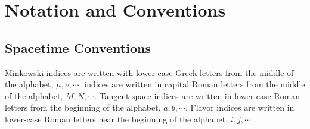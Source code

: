 \documentclass[12pt, oneside]{report}    %
\let\oldsection\section
\def\section{%
  \setcounter{sidenote}{1}%
  \oldsection
}
\begin{document}
\chapter{Notation and Conventions}

\section{Spacetime Conventions}
\label{app:spacetime:conventions}


 Minkowski indices are written with lower-case Greek letters from the middle of the alphabet, $\mu, \nu, \cdots$.  indices are written in capital Roman letters from the middle of the alphabet, $M, N, \cdots$. Tangent space indices are written in lower-case Roman letters from the beginning of the alphabet, $a,b, \cdots$. Flavor indices are written in lower-case Roman letters near the beginning of the alphabet, $i,j,\cdots$.
\end{document}
